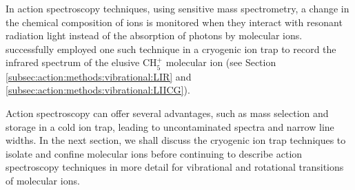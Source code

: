 In action spectroscopy techniques, using sensitive mass spectrometry, a change in the chemical composition of ions is monitored when they interact with resonant radiation light instead of the absorption of photons by molecular ions.
\citet{asvany_understanding_2005} successfully employed one such technique in a
cryogenic ion trap to record the infrared spectrum of the elusive CH$_5^+$
molecular ion (see Section \ref{subsec:action:methods:vibrational:LIR} and
\ref{subsec:action:methods:vibrational:LIICG}).

Action spectroscopy can offer several advantages, such as mass selection and
storage in a cold ion trap, leading to uncontaminated spectra and narrow line
widths. In the next section, we shall discuss the cryogenic ion trap techniques
to isolate and confine molecular ions before continuing to describe action spectroscopy
techniques in more detail for vibrational and rotational transitions of molecular ions.
